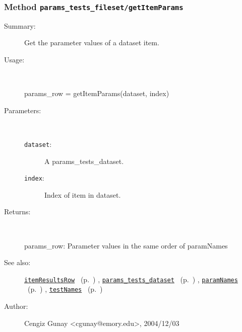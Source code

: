 \subsubsection[Method \texttt{getItemParams}]{Method \texttt{params\_tests\_fileset/getItemParams}}%
%
\label{ref_params_tests_fileset__getItemParams}%
\hypertarget{ref_params_tests_fileset__getItemParams}{}%
\begin{description}
\item[Summary:]Get the parameter values of a dataset item.
%
\item[Usage:]~%
\begin{lyxcode}%
params\_row = getItemParams(dataset, index)
%
\end{lyxcode}%
%
%
\item[Parameters:]~
\begin{description}%
\item[\texttt{dataset}:]
 A params\_tests\_dataset.
\item[\texttt{index}:]
 Index of item in dataset.
\end{description}%
%
\item[Returns:]~

	params\_row: Parameter values in the same order of paramNames
%
%
\item[See also:]%
\hyperlink{ref_itemResultsRow}{\texttt{itemResultsRow}}%
\ (p.~\pageref{ref_itemResultsRow})%
%
, \hyperlink{ref_params_tests_dataset}{\texttt{params\_tests\_dataset}}%
\ (p.~\pageref{ref_params_tests_dataset})%
%
, \hyperlink{ref_paramNames}{\texttt{paramNames}}%
\ (p.~\pageref{ref_paramNames})%
%
, \hyperlink{ref_testNames}{\texttt{testNames}}%
\ (p.~\pageref{ref_testNames})%
%
%
\item[Author:]%
Cengiz Gunay <cgunay@emory.edu>, 2004/12/03%
\end{description}
\methodline%
